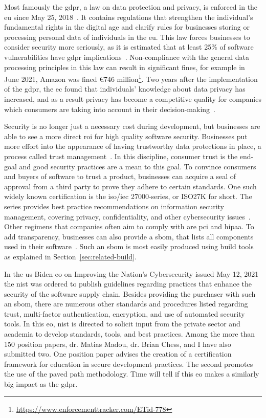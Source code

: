 Most famously the \gls{gdpr}, a law on data protection and privacy, is enforced in the \gls{eu} since May 25, 2018~\cite{gdpr}.
It contains regulations that strengthen the individual's fundamental rights in the digital age and clarify rules for businesses storing or processing personal data of individuals in the \gls{eu}.
This law forces businesses to consider security more seriously, as it is estimated that at least 25\% of software vulnerabilities have \gls{gdpr} implications~\cite{gdprhackerone}.
Non-compliance with the general data processing principles in this law can result in significant fines, for example in June 2021, Amazon was fined €746 million\footnote{\url{https://www.enforcementtracker.com/ETid-778}}.
Two years after the implementation of the \gls{gdpr}, the \gls{ec} found that individuals' knowledge about data privacy has increased, and as a result privacy has become a competitive quality for companies which consumers are taking into account in their decision-making~\cite{gdprfra}.

Security is no longer just a necessary cost during development, but businesses are able to see a more direct \gls{roi} for high quality software security.
Businesses put more effort into the appearance of having trustworthy data protections in place, a process called trust management~\cite{cassandra2021analysis, ashraf2020role}.
In this discipline, consumer trust is the end-goal and good security practices are a mean to this goal.
To convince consumers and buyers of software to trust a product, businesses can acquire a seal of approval from a third party to prove they adhere to certain standards.
One such widely known certification is the \gls{iso}/\gls{iec} 27000-series, or ISO27K for short.
The series provides best practice recommendations on information security management, covering privacy, confidentiality, and other cybersecurity issues~\cite{iso27k}.
Other regimens that companies often aim to comply with are \gls{pci} and \gls{hipaa}.
To add transparency, businesses can also provide a \gls{sbom}, that lists all components used in their software~\cite{sbomntia}.
Such an \gls{sbom} is most easily produced using build tools as explained in Section~\ref{sec:related-build}.

In the \gls{us} Biden \gls{eo} on Improving the Nation's Cybersecurity issued May 12, 2021 the \gls{nist} was ordered to publish guidelines regarding practices that enhance the security of the software supply chain.
Besides providing the purchaser with such an \gls{sbom}, there are numerous other standards and procedures listed regarding trust, multi-factor authentication, encryption, and use of automated security tools.
In this \gls{eo}, \gls{nist} is directed to solicit input from the private sector and academia to develop standards, tools, and best practices.
Among the more than 150 position papers, dr. Matias Madou, dr. Brian Chess, and I have also submitted two.
One position paper advises the creation of a certification framework for education in secure development practices.
The second promotes the use of the paved path methodology.
Time will tell if this \gls{eo} makes a similarly big impact as the \gls{gdpr}.

